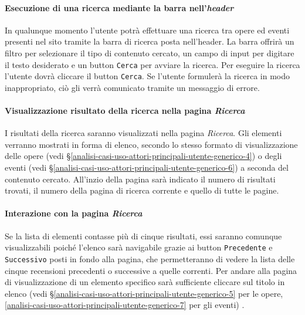 \paragraph{Esecuzione di una ricerca mediante la barra nell'\textit{header}}
\label{analisi-casi-uso-attori-principali-utente-generico-12}
In qualunque momento l'utente potrà effettuare una ricerca tra opere ed eventi presenti nel sito tramite la barra di ricerca posta nell'header. La barra offrirà un filtro per selezionare il tipo di contenuto cercato, un campo di input per digitare il testo desiderato e un button \texttt{Cerca} per avviare la ricerca. Per eseguire la ricerca l'utente dovrà cliccare il button \texttt{Cerca}. Se l'utente formulerà la ricerca in modo inappropriato, ciò gli verrà comunicato tramite un messaggio di errore.


\paragraph{Visualizzazione risultato della ricerca nella pagina \textit{Ricerca}}
\label{analisi-casi-uso-attori-principali-utente-generico-13}
I risultati della ricerca saranno visualizzati nella pagina \textit{Ricerca}. Gli elementi verranno mostrati in forma di elenco, secondo lo stesso formato di visualizzazione delle opere (vedi §\ref{analisi-casi-uso-attori-principali-utente-generico-4}) o degli eventi (vedi §\ref{analisi-casi-uso-attori-principali-utente-generico-6}) a seconda del contenuto cercato. All'inzio della pagina sarà indicato il numero di risultati trovati, il numero della pagina di ricerca corrente e quello di tutte le pagine.


\paragraph{Interazione con la pagina \textit{Ricerca}}
\label{analisi-casi-uso-attori-principali-utente-generico-14}
Se la lista di elementi contasse più di cinque risultati, essi saranno comunque visualizzabili poiché l'elenco sarà navigabile grazie ai button \texttt{Precedente} e \texttt{Successivo} posti in fondo alla pagina, che permetteranno di vedere la lista delle cinque recensioni precedenti o successive a quelle correnti. Per andare alla pagina di visualizzazione di un elemento specifico sarà sufficiente cliccare sul titolo in elenco (vedi §\ref{analisi-casi-uso-attori-principali-utente-generico-5} per le opere, \ref{analisi-casi-uso-attori-principali-utente-generico-7} per gli eventi) .


